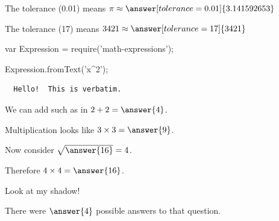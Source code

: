 \documentclass{ximera}
\begin{document}
\begin{problem}
  The tolerance (0.01) means $\pi \approx \answer[tolerance=0.01]{3.141592653}$
\end{problem}

\begin{problem}
  The tolerance (17) means $3421 \approx \answer[tolerance=17]{3421}$
\end{problem}

\begin{code}
  var Expression = require('math-expressions');

  Expression.fromText('x^2');
\end{code}

\begin{verbatim}
  Hello!  This is verbatim.
\end{verbatim}

\begin{problem}
  We can add such as in $2 + 2 = \answer{4}$.
  
  \begin{problem}
    Multiplication looks like $3 \times 3 = \answer{9}$.
    
    \begin{problem}
      Now consider $\sqrt{\answer{16}} = 4$.
      
      \begin{problem}
        Therefore $4 \times 4 = \answer{16}$.
      \end{problem}
    \end{problem}
  \end{problem}
\end{problem}

\begin{theorem}
Look at my shadow!
\end{theorem}

\begin{problem}
  \begin{multipleChoice}
  \end{multipleChoice}

  \begin{problem}
    There were $\answer{4}$ possible answers to that question.

    \begin{problem}
      \begin{multipleChoice}
      \end{multipleChoice}
    \end{problem}
  \end{problem}
\end{problem}
\end{document}
